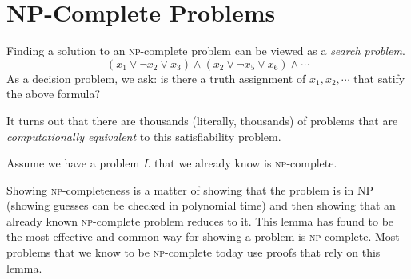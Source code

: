\section{NP-Complete Problems}


Finding a solution to an \textsc{np}-complete problem can be viewed as a \textit{search problem}.
$$(x_1 \vee \neg x_2 \vee x_3) \wedge (x_2 \vee \neg x_5 \vee x_6) \wedge \dotsm $$
As a decision problem, we ask: 
is there a truth assignment of $x_1, x_2, \dotsm$ that satify the above formula?

It turns out that there are thousands (literally, thousands) of problems that 
are \textit{computationally equivalent} to this satisfiability problem.

\frmrule



Assume we have a problem $L$ that we already know is \textsc{np}-complete. 

Showing \textsc{np}-completeness is a matter of showing that the problem is in
NP (showing guesses can be checked in polynomial time) and then 
showing that an already known \textsc{np}-complete problem reduces to it. 
This lemma has found to be the most effective and common way for showing a 
problem is \textsc{np}-complete. Most problems that we know to be 
\textsc{np}-complete today use proofs that rely on this lemma.

